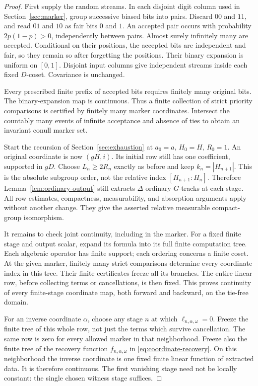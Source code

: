 \documentclass[11pt,a4paper]{article}
\numberwithin{equation}{section}
\begin{document}
\begin{proof}
First supply the random streams. In each disjoint digit column used in
Section~\ref{sec:marker}, group successive biased bits into pairs.
Discard $00$ and $11$, and read $01$ and $10$ as fair bits $0$ and $1$.
An accepted pair occurs with probability $2p(1-p)>0$, independently
between pairs. Almost surely infinitely many are accepted. Conditional
on their positions, the accepted bits are independent and fair, so
they remain so after forgetting the positions. Their binary expansion
is uniform on $[0,1]$. Disjoint input columns give independent streams
inside each fixed $D$-coset. Covariance is unchanged.

Every prescribed finite prefix of accepted bits requires finitely
many original bits. The binary-expansion map is continuous.
Thus a finite collection of strict priority comparisons is certified
by finitely many marker coordinates. Intersect the countably many
events of infinite acceptance and absence of ties to obtain an
invariant conull marker set.

Start the recursion of Section~\ref{sec:exhaustion} at $a_0=a$,
$H_0=H$, $R_0=1$. An original coordinate is now $(gH,i)$.
Its initial row still has one coefficient, supported in $gD$.
Choose $L_n\geq2R_n$ exactly as before and keep
$k_n=|H_{n+1}|$. This is the absolute subgroup order, not the
relative index $[H_{n+1}:H_n]$. Therefore
Lemma~\ref{lem:ordinary-output} still extracts $\Delta$ ordinary
$G$-tracks at each stage. All row estimates, compactness,
measurability, and absorption arguments apply without another change.
They give the asserted relative measurable compact-group isomorphism.

It remains to check joint continuity, including in the marker.
For a fixed finite stage and output scalar, expand its formula into
its full finite computation tree. Each algebraic operator has finite
support; each ordering concerns a finite coset. At the given marker,
finitely many strict comparisons determine every coordinate index in
this tree. Their finite certificates freeze all its branches. The
entire linear row, before collecting terms or cancellations, is then
fixed. This proves continuity of every finite-stage coordinate map,
both forward and backward, on the tie-free domain.

For an inverse coordinate $\alpha$, choose any stage $n$ at which
$\ell_{n,\alpha,\omega}=0$. Freeze the finite tree of this whole row,
not just the terms which survive cancellation. The same row is zero
for every allowed marker in that neighborhood. Freeze also the finite
tree of the recovery function $f_{n,\alpha,\omega}$ in
\eqref{eq:coordinate-recovery}. On this neighborhood the inverse
coordinate is one fixed finite linear function of extracted data.
It is therefore continuous. The first vanishing stage need not be
locally constant: the single chosen witness stage suffices.


\end{proof}
\end{document}
